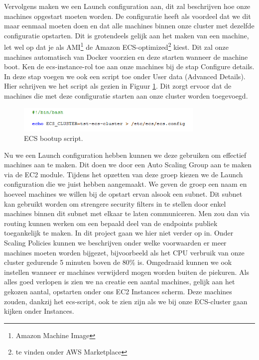 	\par
	Vervolgens maken we een Launch configuration aan, dit zal beschrijven hoe onze machines opgestart moeten worden. De configuratie heeft als voordeel dat we dit maar eenmaal moeten doen en dat alle machines binnen onze cluster met dezelfde configuratie opstarten. Dit is grotendeels gelijk aan het maken van een machine, let wel op dat je als AMI\footnote{Amazon Machine Image} de Amazon ECS-optimized\footnote{te vinden onder AWS Marketplace} kiest. Dit zal onze machines automatisch van Docker voorzien en deze starten wanneer de machine boot. Ken de ecs-instance-rol toe aan onze machines bij de stap Configure details. In deze stap voegen we ook een script toe onder User data (Advanced Details). Hier schrijven we het script als gezien in Figuur \ref{fig:ecs-script}. Dit zorgt ervoor dat de machines die met deze configuratie starten aan onze cluster worden toegevoegd.
	\begin{figure}[h!]
		\centering
  		\includegraphics[width=0.8\textwidth]{images/ecs-script.PNG}
  		\caption{ECS bootup script.}
  		\label{fig:ecs-script}
	\end{figure}
	\par
	Nu we een Launch configuration hebben kunnen we deze gebruiken om effectief machines aan te maken. Dit doen we door een Auto Scaling Group aan te maken via de EC2 module. Tijdens het opzetten van deze groep kiezen we de Launch configuration die we juist hebben aangemaakt. We geven de groep een naam en hoeveel machines we willen bij de opstart ervan alsook een subnet. Dit subnet kan gebruikt worden om strengere security filters in te stellen door enkel machines binnen dit subnet met elkaar te laten communiceren. Men zou dan via routing kunnen werken om een bepaald deel van de endpoints publiek toegankelijk te maken. In dit project gaan we hier niet verder op in. Onder Scaling Policies kunnen we beschrijven onder welke voorwaarden er meer machines moeten worden bijgezet, bijvoorbeeld als het CPU verbruik van onze cluster gedurende 5 minuten boven de 80\% is. Omgedraaid kunnen we ook instellen wanneer er machines verwijderd mogen worden buiten de piekuren. Als alles goed verlopen is zien we na creatie een aantal machines, gelijk aan het gekozen aantal, opstarten onder ons EC2 Instances scherm. Deze machines zouden, dankzij het ecs-script, ook te zien zijn als we bij onze ECS-cluster gaan kijken onder Instances.

